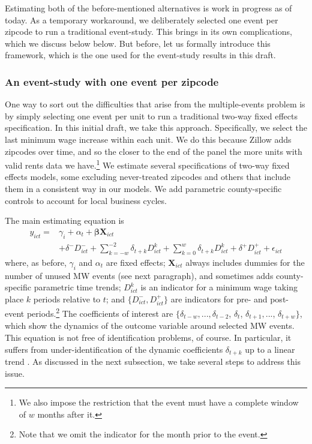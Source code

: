     Estimating both of the before-mentioned alternatives is work in progress as of today. As a temporary workaround, we deliberately selected one event per zipcode to run a traditional event-study. This brings in its own complications, which we discuss below below. But before, let us formally introduce this framework, which is the one used for the event-study results in this draft.

\subsubsection{An event-study with one event per zipcode}

    One way to sort out the difficulties that arise from the multiple-events problem is by simply selecting one event per unit to run a traditional two-way fixed effects specification. In this initial draft, we take this approach. Specifically, we select the last minimum wage increase within each unit. We do this because Zillow adds zipcodes over time, and so the closer to the end of the panel the more units with valid rents data we have.\footnote{We also impose the restriction that the event must have a complete window of $w$ months after it.} We estimate several specifications of two-way fixed effects models, some excluding never-treated zipcodes and others that include them in a consistent way in our models. We add parametric county-specific controls to account for local business cycles. 

    The main estimating equation is
    \begin{equation}\label{eq:last-event-study}
        \begin{split}
            y_{ict} = & \gamma_{i} + \alpha_{t} + \boldsymbol{\beta} \boldsymbol{X}_{ict} \\
            & + \delta^{-} D_{ict}^{-} + \sum\limits_{k = -w}^{-2}\delta_{t + k}D_{ict}^k + \sum\limits_{k = 0}^{w}\delta_{t + k} D_{ict}^k + \delta^{+} D_{ict}^{+} + \epsilon_{ict} 
        \end{split}   
    \end{equation}
    where, as before, $\gamma_{i}$ and $\alpha_{t}$ are fixed effects; $\boldsymbol{X}_{ict}$ always includes dummies for the number of unused MW events (see next paragraph), and sometimes adds county-specific parametric time trends; $D_{ict}^k$ is an indicator for a minimum wage taking place $k$ periods relative to $t$; and $\{D_{ict}^{-}, D_{ict}^{+}\}$ are indicators for pre- and post-event periods.\footnote{Note that we omit the indicator for the month prior to the event.} The coefficients of interest are $\{\delta_{t-w}, ..., \delta_{t-2}$, $\delta_t$, $\delta_{t+1}, ...$, $\delta_{t+w}\}$, which show the dynamics of the outcome variable around selected MW events. This equation is not free of identification problems, of course. In particular, it suffers from under-identification of the dynamic coefficients $\delta_{t+k}$ up to a linear trend \parencite{BorusyakJaravel2017}. As discussed in the next subsection, we take several steps to address this issue.
    
